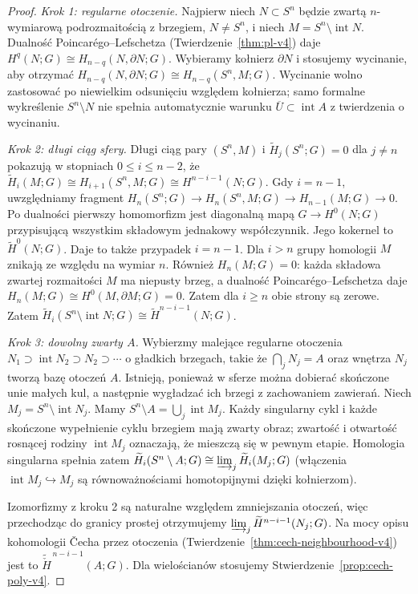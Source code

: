 \documentclass[11pt,a4paper,oneside]{report}
\theoremstyle{plain}
\theoremstyle{definition}
\theoremstyle{remark}
\begin{document}
\begin{proof}
\emph{Krok 1: regularne otoczenie.}
Najpierw niech $N\subset S^n$ będzie zwartą
$n$-wymiarową podrozmaitością z brzegiem,
$N\ne S^n$, i niech $M=S^n\setminus\operatorname{int}N$.
Dualność Poincarégo--Lefschetza
(Twierdzenie~\ref{thm:pl-v4}) daje
$H^q(N;G)\cong H_{n-q}(N,\partial N;G)$.
Wybieramy kołnierz $\partial N$ i stosujemy wycinanie,
aby otrzymać
$H_{n-q}(N,\partial N;G)\cong H_{n-q}(S^n,M;G)$.
Wycinanie wolno zastosować po niewielkim odsunięciu
względem kołnierza; samo formalne wykreślenie
$S^n\setminus N$ nie spełnia automatycznie warunku
$\overline U\subset\operatorname{int}A$ z twierdzenia o wycinaniu.

\emph{Krok 2: długi ciąg sfery.}
Długi ciąg pary $(S^n,M)$ i
$\widetilde H_j(S^n;G)=0$ dla $j\ne n$
pokazują w stopniach $0\le i\le n-2$, że
$\widetilde H_i(M;G)\cong H_{i+1}(S^n,M;G)
\cong H^{n-i-1}(N;G)$.
Gdy $i=n-1$, uwzględniamy fragment
$H_n(S^n;G)\to H_n(S^n,M;G)\to H_{n-1}(M;G)\to0$.
Po dualności pierwszy homomorfizm jest diagonalną mapą
$G\to H^0(N;G)$ przypisującą wszystkim składowym
jednakowy współczynnik. Jego kokernel to
$\widetilde H^0(N;G)$.
Daje to także przypadek $i=n-1$.
Dla $i>n$ grupy homologii $M$ znikają ze względu na
wymiar $n$. Również $H_n(M;G)=0$: każda składowa zwartej
rozmaitości $M$ ma niepusty brzeg, a dualność
Poincarégo--Lefschetza daje
$H_n(M;G)\cong H^0(M,\partial M;G)=0$.
Zatem dla $i\ge n$ obie strony są zerowe.
Zatem
$\widetilde H_i(S^n\setminus\operatorname{int}N;G)
\cong\widetilde H^{n-i-1}(N;G)$.

\emph{Krok 3: dowolny zwarty $A$.}
Wybierzmy malejące regularne otoczenia
$N_1\supset\operatorname{int}N_2\supset N_2\supset\cdots$
o gładkich brzegach, takie że
$\bigcap_jN_j=A$ oraz wnętrza $N_j$ tworzą bazę
otoczeń $A$. Istnieją, ponieważ w sferze można dobierać
skończone unie małych kul, a następnie wygładzać ich
brzegi z zachowaniem zawierań. Niech
$M_j=S^n\setminus\operatorname{int}N_j$.
Mamy $S^n\setminus A=\bigcup_j\operatorname{int}M_j$.
Każdy singularny cykl i każde skończone wypełnienie
cyklu brzegiem mają zwarty obraz; zwartość i otwartość
rosnącej rodziny $\operatorname{int}M_j$ oznaczają, że
mieszczą się w pewnym etapie. Homologia singularna
spełnia zatem
$\widetilde H_i(S^n\setminus A;G)
\cong\varinjlim_j\widetilde H_i(M_j;G)$
(włączenia $\operatorname{int}M_j\hookrightarrow M_j$
są równoważnościami homotopijnymi dzięki kołnierzom).

Izomorfizmy z kroku 2 są naturalne względem zmniejszania
otoczeń, więc przechodząc do granicy prostej otrzymujemy
$\varinjlim_j\widetilde H^{n-i-1}(N_j;G)$.
Na mocy opisu kohomologii \v{C}echa przez otoczenia
(Twierdzenie~\ref{thm:cech-neighbourhood-v4}) jest to
$\widetilde{\check H}^{\,n-i-1}(A;G)$.
Dla wielościanów stosujemy
Stwierdzenie~\ref{prop:cech-poly-v4}.
\end{proof}
\end{document}

